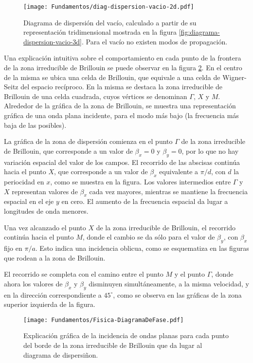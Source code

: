\begin{figure}[h]
	\centering
	\texttt{[image: Fundamentos/diag-dispersion-vacio-2d.pdf]}
	\caption{Diagrama de dispersión del vacío, calculado a partir de su representación tridimensional mostrada en la figura \ref{fig:diagrama-dispersion-vacio-3d}. Para el vacío no existen modos de propagación.}
	\label{fig:diagrama-dispersion-vacio-2d}
\end{figure}

Una explicación intuitiva sobre el comportamiento en cada punto de la frontera de la zona irreducible de Brillouin se puede observar en la figura \ref{fig:explicacion-zona-brillouin}. En el centro de la misma se ubica una celda de Brillouin, que equivale a una celda de Wigner-Seitz del espacio recíproco. En la misma se destaca la zona irreducible de Brillouin de una celda cuadrada, cuyos vértices se denominan $\Gamma$, $X$ y $M$. Alrededor de la gráfica de la zona de Brillouin, se muestra una representación gráfica de una onda plana incidente, para el modo más bajo (la frecuencia más baja de las posibles).

La gráfica de la zona de dispersión comienza en el punto $\Gamma$ de la zona irreducible de Brillouin, que corresponde a un valor de $\beta_x = 0$ y $\beta_y = 0$, por lo que no hay variación espacial del valor de los campos. El recorrido de las abscisas continúa hacia el punto $X$, que corresponde a un valor de $\beta_x$ equivalente a $\pi / d$, con $d$ la periocidad en $x$, como se muestra en la figura. Los valores intermedios entre $\Gamma$ y $X$ representan valores de $\beta_x$ cada vez mayores, mientras se mantiene la frecuencia espacial en el eje $y$ en cero. El aumento de la frecuencia espacial da lugar a longitudes de onda menores.

Una vez alcanzado el punto $X$ de la zona irreducible de Brillouin, el recorrido continúa hacia el punto $M$, donde el cambio se da sólo para el valor de $\beta_y$, con $\beta_x$ fijo en $\pi / a$. Esto indica una incidencia oblicua, como se esquematiza en las figuras que rodean a la zona de Brillouin.

El recorrido se completa con el camino entre el punto $M$ y el punto $\Gamma$, donde ahora los valores de $\beta_x$ y $\beta_y$ disminuyen simultáneamente, a la misma velocidad, y en la dirección correspondiente a $45^\circ$, como se observa en las gráficas de la zona superior izquierda de la figura.

\begin{figure}[h]
	\centering
	\texttt{[image: Fundamentos/Fisica-DiagramaDeFase.pdf]}
	\caption{Explicación gráfica de la incidencia de ondas planas para cada punto del borde de la zona irreducible de Brillouin que da lugar al diagrama de dispersiñon.}
	\label{fig:explicacion-zona-brillouin}
\end{figure}


